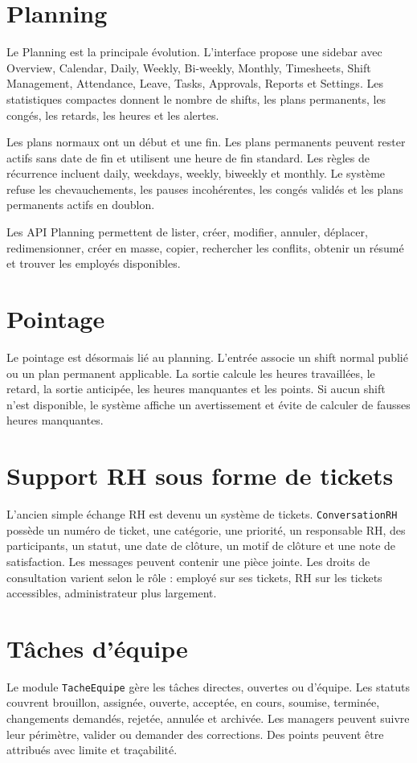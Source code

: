 \documentclass[12pt,a4paper]{report}
\begin{document}
\section{Planning}
Le Planning est la principale évolution. L'interface propose une sidebar avec Overview, Calendar, Daily, Weekly, Bi-weekly, Monthly, Timesheets, Shift Management, Attendance, Leave, Tasks, Approvals, Reports et Settings. Les statistiques compactes donnent le nombre de shifts, les plans permanents, les congés, les retards, les heures et les alertes.

Les plans normaux ont un début et une fin. Les plans permanents peuvent rester actifs sans date de fin et utilisent une heure de fin standard. Les règles de récurrence incluent daily, weekdays, weekly, biweekly et monthly. Le système refuse les chevauchements, les pauses incohérentes, les congés validés et les plans permanents actifs en doublon.

Les API Planning permettent de lister, créer, modifier, annuler, déplacer, redimensionner, créer en masse, copier, rechercher les conflits, obtenir un résumé et trouver les employés disponibles.

\section{Pointage}
Le pointage est désormais lié au planning. L'entrée associe un shift normal publié ou un plan permanent applicable. La sortie calcule les heures travaillées, le retard, la sortie anticipée, les heures manquantes et les points. Si aucun shift n'est disponible, le système affiche un avertissement et évite de calculer de fausses heures manquantes.

\section{Support RH sous forme de tickets}
L'ancien simple échange RH est devenu un système de tickets. \texttt{ConversationRH} possède un numéro de ticket, une catégorie, une priorité, un responsable RH, des participants, un statut, une date de clôture, un motif de clôture et une note de satisfaction. Les messages peuvent contenir une pièce jointe. Les droits de consultation varient selon le rôle : employé sur ses tickets, RH sur les tickets accessibles, administrateur plus largement.

\section{Tâches d'équipe}
Le module \texttt{TacheEquipe} gère les tâches directes, ouvertes ou d'équipe. Les statuts couvrent brouillon, assignée, ouverte, acceptée, en cours, soumise, terminée, changements demandés, rejetée, annulée et archivée. Les managers peuvent suivre leur périmètre, valider ou demander des corrections. Des points peuvent être attribués avec limite et traçabilité.
\end{document}
